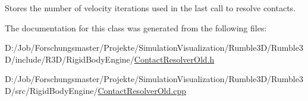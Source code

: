 Stores the number of velocity iterations used in the last call to resolve contacts. 

The documentation for this class was generated from the following files\+:\begin{DoxyCompactItemize}
\item 
D\+:/\+Job/\+Forschungsmaster/\+Projekte/\+Simulation\+Visualization/\+Rumble3\+D/\+Rumble3\+D/include/\+R3\+D/\+Rigid\+Body\+Engine/\mbox{\hyperlink{_contact_resolver_old_8h}{Contact\+Resolver\+Old.\+h}}\item 
D\+:/\+Job/\+Forschungsmaster/\+Projekte/\+Simulation\+Visualization/\+Rumble3\+D/\+Rumble3\+D/src/\+Rigid\+Body\+Engine/\mbox{\hyperlink{_contact_resolver_old_8cpp}{Contact\+Resolver\+Old.\+cpp}}\end{DoxyCompactItemize}
